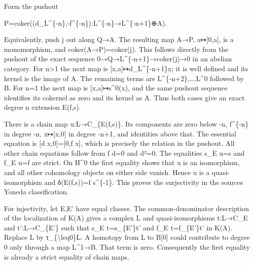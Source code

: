\documentclass[11pt]{article}
\begin{document}
Form the pushout

P\allowbreak{}=coker((d\_\allowbreak{}L\textasciicircum{}\{-n\},\allowbreak{}-f\textasciicircum{}\{-n\})\allowbreak{}:\allowbreak{}L\textasciicircum{}\{-n\}\allowbreak{}→L\textasciicircum{}\{-n\allowbreak{}+1\}\allowbreak{}⊕A)\allowbreak{}.

Equivalently,\allowbreak{} push j out along Q\allowbreak{}→A. The resulting map A\allowbreak{}→P,\allowbreak{} a\allowbreak{}↦[0,\allowbreak{}a]\allowbreak{},\allowbreak{} is a monomorphism,\allowbreak{} and coker(A\allowbreak{}→P)\allowbreak{}\allowbreak{}=coker(j)\allowbreak{}. This follows directly from the pushout of the exact sequence 0\allowbreak{}→Q\allowbreak{}→L\textasciicircum{}\{-n\allowbreak{}+1\}\allowbreak{}→coker(j)\allowbreak{}\allowbreak{}→0 in an abelian category. For n\textgreater1 the next map is [x,\allowbreak{}a]\allowbreak{}\allowbreak{}↦d\_\allowbreak{}L\textasciicircum{}\{-n\allowbreak{}+1\}x; it is well defined and its kernel is the image of A. The remaining terms are L\textasciicircum{}\{-n\allowbreak{}+2\},\allowbreak{}…,\allowbreak{}L\textasciicircum{}0 followed by B. For n\allowbreak{}=1 the next map is [x,\allowbreak{}a]\allowbreak{}\allowbreak{}↦s\textasciicircum{}0(x)\allowbreak{},\allowbreak{} and the same pushout sequence identifies its cokernel as zero and its kernel as A. Thus both cases give an exact degree n extension E(f,\allowbreak{}s)\allowbreak{}.

There is a chain map u:\allowbreak{}L\allowbreak{}→C\_\allowbreak{}\{E(f,\allowbreak{}s)\allowbreak{}\}. Its components are zero below -n,\allowbreak{} f\^{}\{-n\} in degree -n,\allowbreak{} x\allowbreak{}↦[x,\allowbreak{}0]\allowbreak{} in degree -n\allowbreak{}+1,\allowbreak{} and identities above that. The essential equation is {[}d x,\allowbreak{}0]\allowbreak{}\allowbreak{}=[0,\allowbreak{}f x]\allowbreak{},\allowbreak{} which is precisely the relation in the pushout. All other chain equations follow from f d\allowbreak{}=0 and d²\allowbreak{}=0. The equalities s\_\allowbreak{}E u\allowbreak{}=s and f\_\allowbreak{}E u\allowbreak{}=f are strict. On H\^{}0 the first equality shows that u is an isomorphism,\allowbreak{} and all other cohomology objects on either side vanish. Hence u is a quasi-isomorphism and δ(E(f,\allowbreak{}s)\allowbreak{})\allowbreak{}\allowbreak{}=f s\^{}\{-1\}. This proves the surjectivity in the source\textquotesingle s Yoneda classification.

For injectivity,\allowbreak{} let E,\allowbreak{}E' have equal classes. The common-denominator description of the localization of K(A)\allowbreak{} gives a complex L and quasi-isomorphisms t:\allowbreak{}L\allowbreak{}→C\_\allowbreak{}E and t':\allowbreak{}L\allowbreak{}→C\_\allowbreak{}\{E'\} such that s\_\allowbreak{}E t\allowbreak{}=s\_\allowbreak{}\{E'\}t' and f\_\allowbreak{}E t\allowbreak{}=f\_\allowbreak{}\{E'\}t' in K(A)\allowbreak{}. Replace L by τ\_\allowbreak{}\{\textbackslash{}leq0\}L. A homotopy from L to B[0]\allowbreak{} could contribute to degree 0 only through a map L\textasciicircum{}1\allowbreak{}→B. That term is zero. Consequently the first equality is already a strict equality of chain maps.
\end{document}
